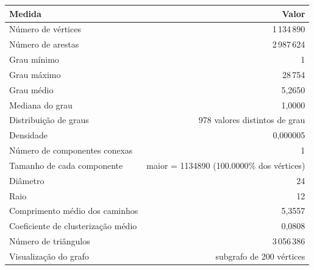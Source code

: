 \begin{tabular}{lr}
    \toprule
    Medida & Valor \\
    \midrule
    Número de vértices & 1\,134\,890 \\
    Número de arestas & 2\,987\,624 \\
    Grau mínimo & 1 \\
    Grau máximo & 28\,754 \\
    Grau médio & 5,2650 \\
    Mediana do grau & 1,0000 \\
    Distribuição de graus & 978 valores distintos de grau \\
    Densidade & 0,000005 \\
    Número de componentes conexas & 1 \\
    Tamanho de cada componente & maior = 1134890 (100.0000\% dos vértices) \\
    Diâmetro & 24 \\
    Raio & 12 \\
    Comprimento médio dos caminhos & 5,3557 \\
    Coeficiente de clusterização médio & 0,0808 \\
    Número de triângulos & 3\,056\,386 \\
    Visualização do grafo & subgrafo de 200 vértices \\
    \bottomrule
\end{tabular}
